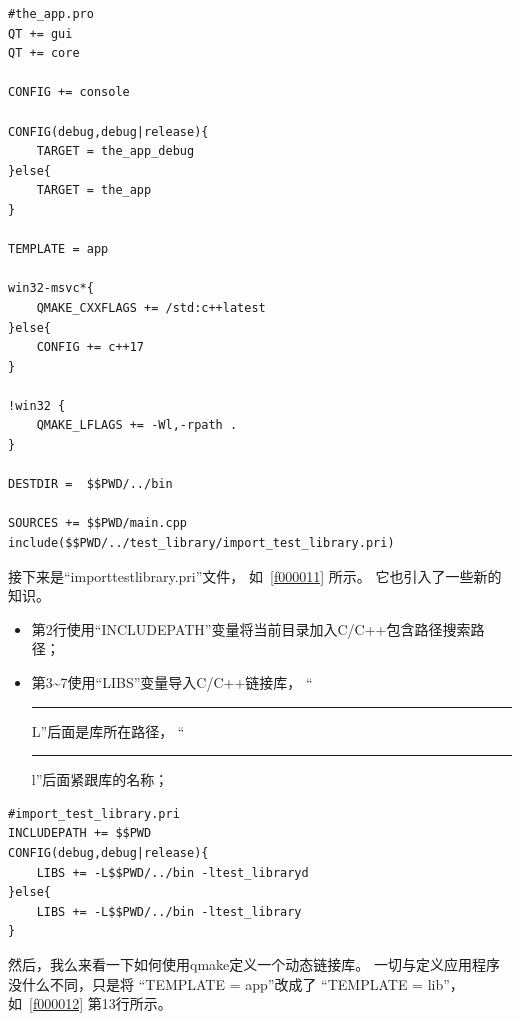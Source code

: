 \begin{lstlisting}[label=f000016,
caption=GoodLuck,
title=\lstlistingname\ \thelstlisting
]
#the_app.pro
QT += gui
QT += core

CONFIG += console

CONFIG(debug,debug|release){
    TARGET = the_app_debug
}else{
    TARGET = the_app
}

TEMPLATE = app

win32-msvc*{
    QMAKE_CXXFLAGS += /std:c++latest
}else{
    CONFIG += c++17
}

!win32 {
    QMAKE_LFLAGS += -Wl,-rpath .
}

DESTDIR =  $$PWD/../bin

SOURCES += $$PWD/main.cpp
include($$PWD/../test_library/import_test_library.pri)
\end{lstlisting}          %


接下来是“import\underline{\hspace{0.5em}}test\underline{\hspace{0.5em}}library.pri”文件，
如\lstlistingname\ \ref{f000011} 所示。
它也引入了一些新的知识。
\begin{itemize}
\item 第2行使用“INCLUDEPATH”变量将当前目录加入C/C{\sourcefonttwo{}+}{\sourcefonttwo{}+}包含路径搜索路径；
\item 第3{\sourcefonttwo\~{}}7使用“LIBS”变量导入C/C{\sourcefonttwo{}+}{\sourcefonttwo{}+}链接库，
“\hspace{0.05em}\rule[0.7ex]{0.4em}{0.6pt}\hspace{0.05em}L”后面是库所在路径，
“\hspace{0.05em}\rule[0.7ex]{0.4em}{0.6pt}\hspace{0.05em}l”后面紧跟库的名称；
\end{itemize}
\begin{lstlisting}[label=f000011,
caption=GoodLuck,
title=\lstlistingname\ \thelstlisting
]
#import_test_library.pri
INCLUDEPATH += $$PWD
CONFIG(debug,debug|release){
    LIBS += -L$$PWD/../bin -ltest_libraryd
}else{
    LIBS += -L$$PWD/../bin -ltest_library
}
\end{lstlisting}          %


然后，我么来看一下如何使用qmake定义一个动态链接库。
一切与定义应用程序没什么不同，只是将
“TEMPLATE {\sourcefonttwo{}=} app”改成了
“TEMPLATE {\sourcefonttwo{}=} lib”，如\lstlistingname\ \ref{f000012} 第13行所示。

